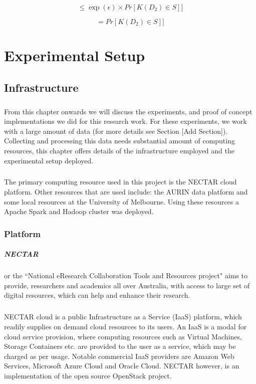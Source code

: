 \documentclass[12pt]{report}
\theoremstyle{named}
\begin{document}
\begin{equation}
[Pr[\mathit{K}(D_{1})\in S] \leq \exp (\epsilon ) \times Pr[\mathit{K}(D_{2})\in S]] \end{equation}

\begin{equation}
[Pr[\mathit{K}(D_{1})\in S]  = Pr[\mathit{K}(D_{2})\in S]]
\end{equation}


\chapter{Experimental Setup}
\section{Infrastructure}
\paragraph{}
From this chapter onwards we will discuss the experiments, and proof of concept implementations we did for this research work. For these experiments, we work with a large amount of data (for more details see Section [Add Section]). Collecting and processing this data needs substantial amount of computing resources, this chapter offers details of the infrastructure employed and the experimental setup deployed.
\paragraph{}
The primary computing resource used in this project is the NECTAR\cite{NECTAR} cloud platform. Other resources that are used include: the AURIN\cite{AURIN} data platform and some local resources at the University of Melbourne. Using these resources a Apache Spark and Hadoop cluster was deployed.

\subsection{Platform}
\paragraph{NECTAR} or the ``National eResearch Collaboration Tools and Resources project" aims to provide, researchers and academics all over Australia, with access to large set of digital resources, which can help and enhance their research. 
\paragraph{}
NECTAR cloud is a public Infrastructure as a Service (IaaS) platform, which readily supplies on demand cloud resources to its users. An IaaS is a modal for cloud service provision, where computing resources such as Virtual Machines, Storage Containers etc. are provided to the user as a service, which may be charged as per usage. Notable commercial IaaS providers are Amazon Web Services\cite{AWS}, Microsoft Azure Cloud\cite{Azure} and Oracle Cloud\cite{OracleCloud}. NECTAR however, is an implementation of the open source OpenStack\cite{OpenStack} project.
\end{document}
